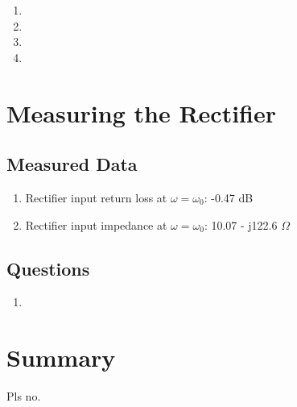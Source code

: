 \documentclass{article}
\begin{document}
\begin{enumerate}
	\item
	\item
	\item
	\item
\end{enumerate}


\section{Measuring the Rectifier}

\subsection{Measured Data}

\begin{enumerate}
	\item Rectifier input return loss at $\omega = \omega_0$: -0.47 dB
	\item Rectifier input impedance at $\omega = \omega_0$: 10.07 - j122.6 $\Omega$
\end{enumerate}

\subsection{Questions}

\begin{enumerate}
	\item
\end{enumerate}

\section{Summary}
Pls no.
\end{document}
